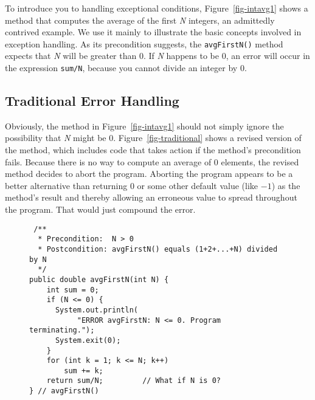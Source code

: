 \noindent To introduce you to handling exceptional conditions,
Figure~\ref{fig-intavg1} shows a method that computes the average of
the first {\it N} integers, an admittedly contrived example.  We use
it mainly to illustrate the basic concepts involved in exception
handling. As its precondition suggests, the {\tt avgFirstN()} method
expects that {\it N} will be greater than 0.  If {\it N} happens to be
0, an error will occur in the expression {\tt sum/N}, because you
cannot divide an integer by 0.

\subsection{Traditional Error Handling}
\noindent Obviously, the method in Figure~\ref{fig-intavg1} should not
simply ignore the possibility that {\it N}
might be 0. Figure~\ref{fig-traditional} shows a revised version of
the method, which includes code that takes action if the method's
precondition fails.  Because there is no way to compute an average of
0 elements, the revised method decides to abort the program.  Aborting
the program appears to be a better alternative than returning 0 or
some other default value (like $-1$) as the method's result and
thereby allowing an erroneous value to spread throughout the
program.  That would just compound the error.



\begin{figure}[tb]
\jjjprogstart
\begin{jjjlisting}[28pc]
\begin{lstlisting}
 /**
  * Precondition:  N > 0
  * Postcondition: avgFirstN() equals (1+2+...+N) divided by N
  */
public double avgFirstN(int N) {
    int sum = 0;
    if (N <= 0) {
      System.out.println(
           "ERROR avgFirstN: N <= 0. Program terminating.");
      System.exit(0);
    }
    for (int k = 1; k <= N; k++)
        sum += k;
    return sum/N;         // What if N is 0?
} // avgFirstN()
\end{lstlisting}
\end{jjjlisting}
\end{figure}

